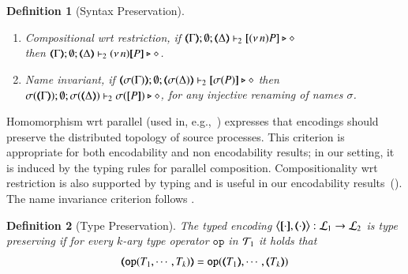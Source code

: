 \documentclass[preprint,11pt]{elsarticle}
\newtheorem{definition}{Definition}[section]
\begin{document}
{\begin{definition}[Syntax Preservation]
\begin{enumerate}[1.]
		\item	\emph{Compositional wrt restriction},  if 
		$\mapt{\Gamma}; \emptyset; \mapt{\Delta} \proves_2 \map{\news{n}P} \hastype \Proc$ \\
		then 
		$\mapt{\Gamma}; \emptyset; \mapt{\Delta} \proves_2 \news{n}\map{P} \hastype \Proc$.
		
		\item \emph{Name invariant},   if
		$\mapt{\sigma(\Gamma)}; \emptyset; \mapt{\sigma(\Delta)} \proves_2 \map{\sigma(P)} \hastype \Proc$
		then \\
		$\sigma(\mapt{\Gamma}); \emptyset; \sigma(\mapt{\Delta}) \proves_2 \sigma(\map{P}) \hastype \Proc$, 
		for any injective renaming  of names $\sigma$.
	\end{enumerate}
\end{definition}


Homomorphism wrt parallel (used in, e.g.,~\cite{Palamidessi03,DBLP:conf/lics/PalamidessiSVV06})
expresses that encodings should preserve the distributed topology of source processes. This criterion
 is appropriate for both encodability and non encodability results; in our setting, it is
induced by the typing rules for parallel composition.
Compositionality wrt restriction 
is also supported by typing and is 
useful in our encodability results~().
The name invariance criterion follows \cite{DBLP:journals/iandc/Gorla10,DBLP:conf/icalp/LanesePSS10}. 


\begin{definition}[Type Preservation]
	\label{def:tp}
	The typed encoding 
	$\enco{\map{\cdot}, \mapt{\cdot}}: \tyl{L}_1 \to \tyl{L}_2$ is \emph{type preserving}
	if for every $k$-ary type operator $\mathtt{op}$ in ${\cal{T}}_1$ it holds that 
	 $$\mapt{\mathtt{op}(T_1, \cdots, T_k)} = \mathtt{op}(\mapt{T_1}, \cdots, \mapt{T_k})$$
	\end{definition}


}
\end{document}
